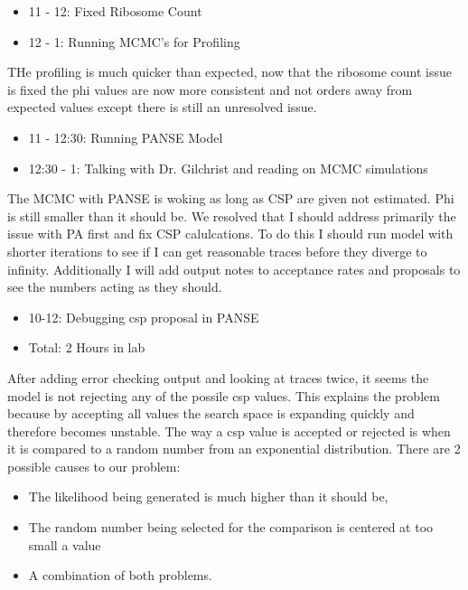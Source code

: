 \documentclass[12pt,hyperref]{labbook}
\begin{document}
\begin{itemize}
    \item 11 - 12: Fixed Ribosome Count
    \item 12 - 1: Running MCMC's for Profiling
\end{itemize}
THe profiling is much quicker than expected, now that the ribosome count issue is fixed the phi values are now more consistent and not orders
away from expected values except there is still an unresolved issue.
\begin{itemize}
    \item 11 - 12:30: Running PANSE Model
    \item 12:30 - 1: Talking with Dr. Gilchrist and reading on MCMC simulations
\end{itemize}
The MCMC with PANSE is woking as long as CSP are given not estimated. Phi is still smaller than it should be.
We resolved that I should address primarily the issue with PA first and fix CSP calulcations. To do this I should run model with shorter
iterations to see if I can get reasonable traces before they diverge to infinity. Additionally I will add output notes to acceptance rates
and proposals to see the numbers acting as they should.
\begin{itemize}
    \item 10-12: Debugging csp proposal in PANSE
    \item Total: 2 Hours in lab
\end{itemize}
After adding error checking output and looking at traces twice, it seems the model is not rejecting any of the possile csp values.
This explains the problem because by accepting all values the search space is expanding quickly and therefore becomes unstable.
The way a csp value is accepted or rejected is when it is compared to a random number from an exponential distribution. There are 2
possible causes to our problem:
\begin{itemize}
    \item The likelihood being generated is much higher than it should be,
    \item The random number being selected for the comparison is centered at too small a value
    \item A combination of both problems.
\end{itemize}
\end{document}
